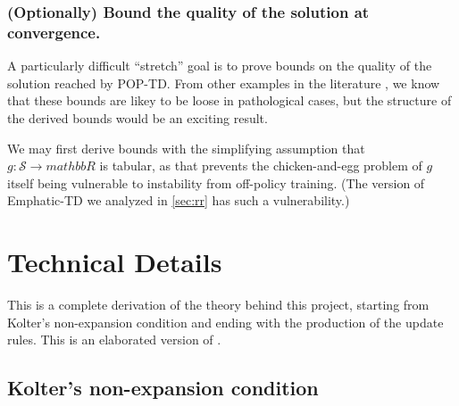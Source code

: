 \documentclass[11pt]{article}
\begin{document}
\subsubsection{(Optionally) Bound the quality of the solution at convergence. }

A particularly difficult ``stretch'' goal is to prove bounds on the quality of the solution reached by POP-TD. From other examples in the literature \cite{zhang2020provably,zhang2021breaking}, we know that these bounds are likey to be loose in pathological cases, but the structure of the derived bounds would be an exciting result.

We may first derive bounds with the simplifying assumption that $g : \mathcal S \to mathbb R$ is tabular, as that prevents the chicken-and-egg problem of $g$ itself being vulnerable to instability from off-policy training. (The version of Emphatic-TD we analyzed in \ref{sec:rr} has such a vulnerability.)


\clearpage

\printbibliography

\clearpage

\appendix

\section{Technical Details}

This is a complete derivation of the theory behind this project, starting from Kolter's non-expansion condition \cite{kolter2011fixed} and ending with the production of the update rules. This is an elaborated version of \cite{kolternote2022}.

\subsection{Kolter's non-expansion condition}
\end{document}
